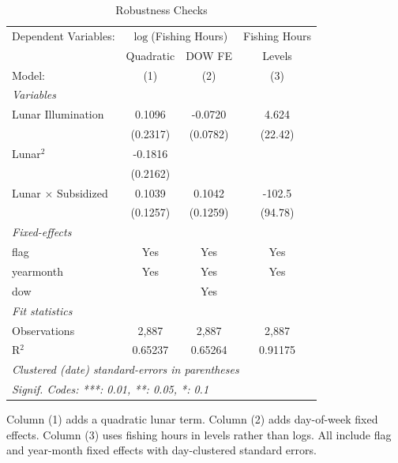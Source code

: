 
\begin{table}[htbp]
   \caption{\label{tab:robust} Robustness Checks}
   \centering
   \begin{tabular}{lccc}
      \tabularnewline \midrule \midrule
      Dependent Variables: & \multicolumn{2}{c}{$\log$(Fishing Hours)} & Fishing Hours\\
                                 & Quadratic & DOW FE   & Levels \\   
      Model:                     & (1)       & (2)      & (3)\\  
      \midrule
      \emph{Variables}\\
      Lunar Illumination         & 0.1096    & -0.0720  & 4.624\\   
                                 & (0.2317)  & (0.0782) & (22.42)\\   
      Lunar$^2$                  & -0.1816   &          &   \\   
                                 & (0.2162)  &          &   \\   
      Lunar $\times$ Subsidized  & 0.1039    & 0.1042   & -102.5\\   
                                 & (0.1257)  & (0.1259) & (94.78)\\   
      \midrule
      \emph{Fixed-effects}\\
      flag                       & Yes       & Yes      & Yes\\  
      yearmonth                  & Yes       & Yes      & Yes\\  
      dow                        &           & Yes      & \\  
      \midrule
      \emph{Fit statistics}\\
      Observations               & 2,887     & 2,887    & 2,887\\  
      R$^2$                      & 0.65237   & 0.65264  & 0.91175\\  
      \midrule \midrule
      \multicolumn{4}{l}{\emph{Clustered (date) standard-errors in parentheses}}\\
      \multicolumn{4}{l}{\emph{Signif. Codes: ***: 0.01, **: 0.05, *: 0.1}}\\
   \end{tabular}
   
   \par \raggedright 
   Column (1) adds a quadratic lunar term. Column (2) adds day-of-week fixed effects. Column (3) uses fishing hours in levels rather than logs. All include flag and year-month fixed effects with day-clustered standard errors.
\end{table}


